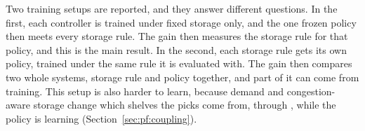 Two training setups are reported, and they answer different questions. %
In the first, each controller is trained under fixed storage only, and the
one frozen policy then meets every storage rule. The gain then measures the
storage rule for that policy, and this is the main result. In the second,
each storage rule gets its own policy, trained under the same rule it is
evaluated with. The gain then compares two whole systems, storage rule and
policy together, and part of it can come from training. This setup is also
harder to learn, because demand and congestion-aware storage change which %
shelves the picks come from, through , while the policy is
learning (Section~\ref{sec:pf:coupling}).


